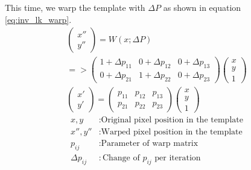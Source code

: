 \documentclass[11pt,a4paper,titlepage,oneside]{report}
\begin{document}
This time, we warp the template with $\Delta P$ as shown in equation \ref{eq:inv_lk_warp}. 
\begin{equation}\label{eq:inv_lk_warp}
  \begin{gathered}
    \begin{pmatrix}
      x'' \\
      y''
    \end{pmatrix}=
    W(x;\Delta P)\\
    =>\begin{pmatrix}
      1 + \Delta p_{11} & 0 + \Delta p_{12} & 0 + \Delta p_{13} \\
      0 + \Delta p_{21} & 1 + \Delta p_{22} & 0 + \Delta p_{23}
    \end{pmatrix}
    \begin{pmatrix}
      x\\
      y\\
      1
    \end{pmatrix}\\
    \begin{pmatrix}
      x' \\
      y'
    \end{pmatrix}=
    \begin{pmatrix}
      p_{11} & p_{12} & p_{13} \\
      p_{21} & p_{22} & p_{23}
    \end{pmatrix}
    \begin{pmatrix}
      x\\
      y\\
      1
    \end{pmatrix}
  \end{gathered}
\end{equation}
\begin{align*}
  x,y            &: \text{Original pixel position in the template}\\
  x'',y''        &: \text{Warped pixel position in the template}\\
  p_{ij}         &: \text{Parameter of warp matrix}\\
  \Delta p_{ij}  &: \text{Change of $p_{ij}$ per iteration}
\end{align*}
\end{document}
